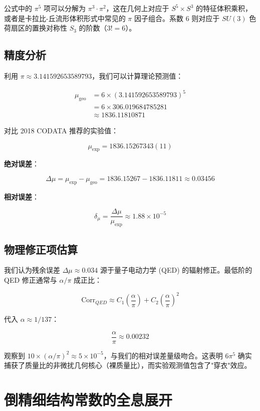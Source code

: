 公式中的 $\pi^5$ 项可以分解为 $\pi^3 \cdot \pi^2$，这在几何上对应于 $S^5 \times S^3$ 的特征体积乘积，或者是卡拉比-丘流形体积形式中常见的 $\pi$ 因子组合。系数 $6$ 则对应于 $SU(3)$ 色荷扇区的置换对称性 $S_3$ 的阶数（$3! = 6$）。

\subsection{精度分析}

利用 $\pi \approx 3.141592653589793$，我们可以计算理论预测值：

\[\begin{aligned}
\mu_{\text{geo}} &= 6 \times (3.141592653589793)^5 \\
&= 6 \times 306.019684785281 \\
&\approx 1836.11810871
\end{aligned}\]

对比 2018 CODATA 推荐的实验值：

\[\mu_{\text{exp}} = 1836.15267343(11)\]

\textbf{绝对误差}：

\[\Delta \mu = \mu_{\text{exp}} - \mu_{\text{geo}} = 1836.15267 - 1836.11811 \approx 0.03456\]

\textbf{相对误差}：

\[\delta_{\mu} = \frac{\Delta \mu}{\mu_{\text{exp}}} \approx 1.88 \times 10^{-5}\]

\subsection{物理修正项估算}

我们认为残余误差 $\Delta \mu \approx 0.034$ 源于量子电动力学 (QED) 的辐射修正。最低阶的 QED 修正通常与 $\alpha/\pi$ 成正比：

\[\text{Corr}_{QED} \approx C_1 \left( \frac{\alpha}{\pi} \right) + C_2 \left( \frac{\alpha}{\pi} \right)^2\]

代入 $\alpha \approx 1/137$：

\[\frac{\alpha}{\pi} \approx 0.00232\]

观察到 $10 \times (\alpha/\pi)^2 \approx 5 \times 10^{-5}$，与我们的相对误差量级吻合。这表明 $6\pi^5$ 确实捕获了质量比的非微扰几何核心（裸质量比），而实验观测值包含了"穿衣"效应。

\hrulefill

\section{倒精细结构常数的全息展开}

